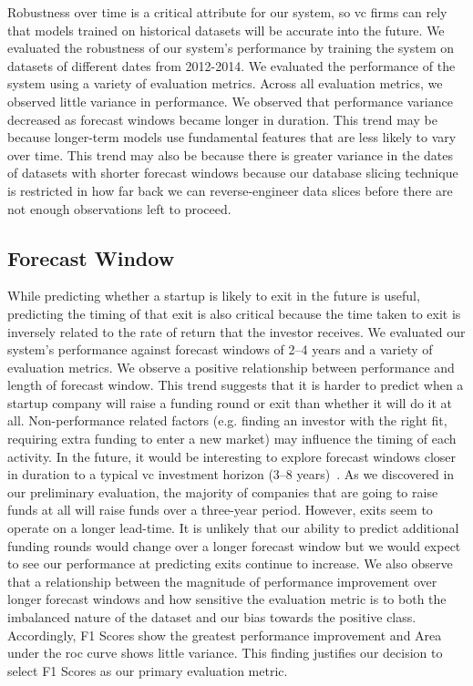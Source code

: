 \documentclass[../thesis/thesis.tex]{subfiles}
\begin{document}
Robustness over time is a critical attribute for our system, so \gls{vc} firms can rely that models trained on historical datasets will be accurate into the future. We evaluated the robustness of our system's performance by training the system on datasets of different dates from 2012-2014. We evaluated the performance of the system using a variety of evaluation metrics. Across all evaluation metrics, we observed little variance in performance. We observed that performance variance decreased as forecast windows became longer in duration. This trend may be because longer-term models use fundamental features that are less likely to vary over time. This trend may also be because there is greater variance in the dates of datasets with shorter forecast windows because our database slicing technique is restricted in how far back we can reverse-engineer data slices before there are not enough observations left to proceed.

\subsection{Forecast Window}

While predicting whether a startup is likely to exit in the future is useful, predicting the timing of that exit is also critical because the time taken to exit is inversely related to the rate of return that the investor receives. We evaluated our system's performance against forecast windows of 2--4 years and a variety of evaluation metrics. We observe a positive relationship between performance and length of forecast window. This trend suggests that it is harder to predict when a startup company will raise a funding round or exit than whether it will do it at all. Non-performance related factors (e.g. finding an investor with the right fit, requiring extra funding to enter a new market) may influence the timing of each activity. In the future, it would be interesting to explore forecast windows closer in duration to a typical \gls{vc} investment horizon (3--8 years)~\cite{gompers1995}. As we discovered in our preliminary evaluation, the majority of companies that are going to raise funds at all will raise funds over a three-year period. However, exits seem to operate on a longer lead-time. It is unlikely that our ability to predict additional funding rounds would change over a longer forecast window but we would expect to see our performance at predicting exits continue to increase. We also observe that a relationship between the magnitude of performance improvement over longer forecast windows and how sensitive the evaluation metric is to both the imbalanced nature of the dataset and our bias towards the positive class. Accordingly, F1 Scores show the greatest performance improvement and Area under the \gls{roc} curve shows little variance. This finding justifies our decision to select F1 Scores as our primary evaluation metric.
\end{document}
